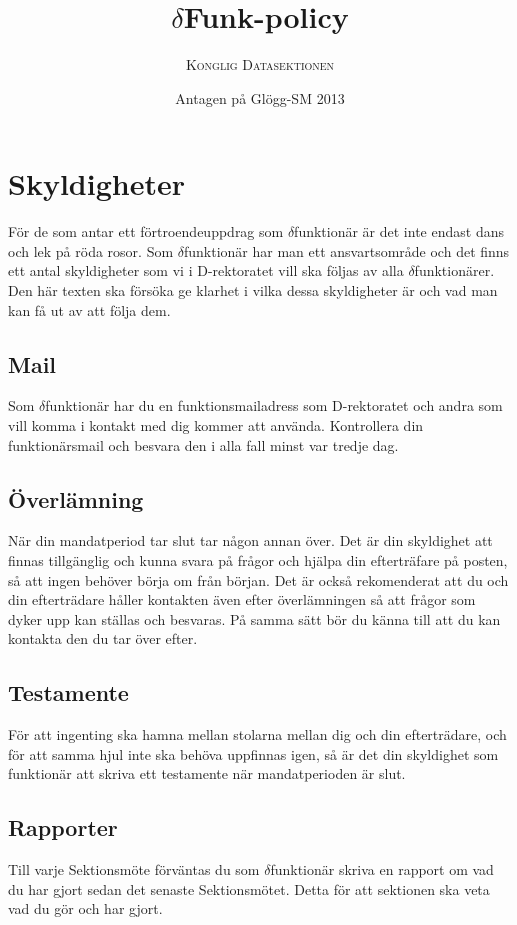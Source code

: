 \documentclass[a4paper,11pt]{article}
\title{$\delta$Funk-policy}
\author{\textsc{Konglig Datasektionen}}
\date{Antagen på Glögg-SM 2013}
\begin{document}
\maketitle

\section{Skyldigheter}
För de som antar ett förtroendeuppdrag som $\delta$funktionär är det inte endast dans och lek på röda rosor. Som $\delta$funktionär har man ett ansvartsområde och det finns ett antal skyldigheter som vi i D-rektoratet vill ska följas av alla $\delta$funktionärer. Den här texten ska försöka ge klarhet i vilka dessa skyldigheter är och vad man kan få ut av att följa dem.

\subsection{Mail}
Som $\delta$funktionär har du en funktionsmailadress som D-rektoratet och andra som vill komma i kontakt med dig kommer att använda. Kontrollera din funktionärsmail och besvara den i alla fall minst var tredje dag.

\subsection{Överlämning}
När din mandatperiod tar slut tar någon annan över. Det är din skyldighet att finnas tillgänglig och kunna svara på frågor och hjälpa din efterträfare på posten, så att ingen behöver börja om från början. Det är också rekomenderat att du och din efterträdare håller kontakten även efter överlämningen så att frågor som dyker upp kan ställas och besvaras. På samma sätt bör du känna till att du kan kontakta den du tar över efter.

\subsection{Testamente}
För att ingenting ska hamna mellan stolarna mellan dig och din efterträdare, och för att samma hjul inte ska behöva uppfinnas igen, så är det din skyldighet som funktionär att skriva ett testamente när mandatperioden är slut. 

\subsection{Rapporter}
Till varje Sektionsmöte förväntas du som $\delta$funktionär skriva en rapport om vad du har gjort sedan det senaste Sektionsmötet. Detta för att sektionen ska veta vad du gör och har gjort.
\end{document}
